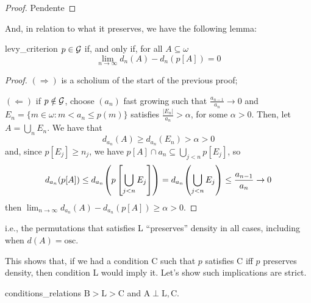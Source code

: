 \begin{proof}
    \textcolor{laser_eyes}{Pendente}
\end{proof}

And, in relation to what it preserves, we have the following lemma:

\begin{lemma}{}{levy_criterion}
    $p\in\mathcal{G}$ if, and only if, for all $A\subseteq\omega$
    $$\lim_{n\to\infty} d_n(A)-d_n(p[A])=0$$
\end{lemma}

\begin{proof}
    $(\Rightarrow)$ is a scholium of the start of the previous proof;

    $(\Leftarrow)$ if $p\notin\mathcal{G}$, choose $(a_n)$ fast growing such that $\frac{a_{n-1}}{a_n}\to0$ and $E_n=\{m\in\omega:m<a_n\leq p(m)\}$ satisfies $\frac{\lvert E_n\rvert}{a_n}>\alpha$, for some $\alpha>0$. Then, let $A=\bigcup_nE_n$. We have that
    $$d_{a_n}(A)\geq d_{a_n}(E_n)>\alpha>0$$
    and, since $p[E_j]\geq n_j$, we have $p[A]\cap a_n\subseteq\bigcup_{j<n}p[E_j]$, so
    $$d_{a_n}(p[A])\leq d_{a_n}{\left(p\left[\bigcup_{j<n}E_j\right]\right)}=d_{a_n}{\left(\bigcup_{j<n}E_j\right)}\leq\frac{a_{n-1}}{a_n}\to0$$
    then $\lim_{n\to\infty}d_{a_n}(A)-d_{a_n}(p[A])\geq\alpha>0$.
\end{proof}

i.e., the permutations that satisfies L ``preserves'' density in all cases, including when $d(A)=\text{osc}$.

This shows that, if we had a condition C such that $p$ satisfies C iff $p$ preserves density, then condition L would imply it. Let's show such implications are strict.

\begin{theorem}{}{conditions_relations}
    $\text{B}>\text{L}>\text{C}$ and $\text{A}\perp\text{L},\text{C}$.
\end{theorem}

